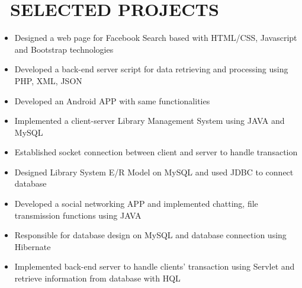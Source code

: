 \documentclass{resume}
\begin{document}
\section{\faUsers\ SELECTED PROJECTS}
\begin{itemize}
  \item Designed a web page for Facebook Search based with HTML/CSS, Javascript and Bootstrap technologies
  \item Developed a back-end server script for data retrieving and processing using PHP, XML, JSON 
  \item Developed an Android APP with same functionalities
\end{itemize}


\begin{itemize}
  \item Implemented a client-server Library Management System using JAVA and MySQL 
  \item Established socket connection between client and server to handle transaction
  \item Designed  Library System E/R Model on MySQL and used JDBC to connect database
\end{itemize}

\begin{itemize}
  \item Developed a social networking APP and implemented chatting, file transmission functions using JAVA
  \item Responsible for database design on MySQL and database connection using Hibernate
  \item Implemented back-end server to handle clients' transaction using Servlet and retrieve information from database with HQL
\end{itemize}
\end{document}
